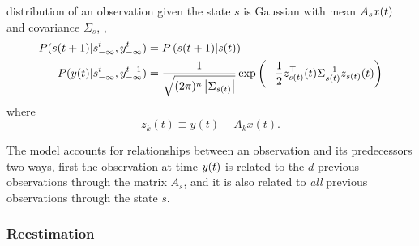 distribution of an observation given the state $s$ is Gaussian with
mean $A_s {x}{(t)}$ and covariance $\Sigma_s$, \ie,
\begin{align}
  \label{eq:assume_markovVARG}
  P({s}{(t+1)}|s_{-\infty}^{t},y_{-\infty}^{t}) &= 
  P\left({s}{(t+1)}|{s}{(t)}\right)\\
  \label{eq:assume_outputVARG}
  P({y}{(t)}|s_{-\infty}^{t},y_{-\infty}^{t-1}) &=
    \frac{1}{\sqrt{ (2 \pi)^n \left|\Sigma_{s(t)}\right|}}
    \exp\left({-\frac{1}{2} z_{s(t)}^\top(t) \Sigma_{s(t)}^{-1}
    z_{s(t)}(t)} \right)
\end{align}
where
\begin{equation*}
z_k(t) \equiv y(t) - A_k x(t).  
\end{equation*}

The model accounts for relationships between an observation and its
predecessors two ways, first the observation at time ${y}{(t)}$ is
related to the $d$ previous observations through the matrix $A_s$, and
it is also related to \emph{all} previous observations through the state $s$.

\subsubsection{Reestimation}

